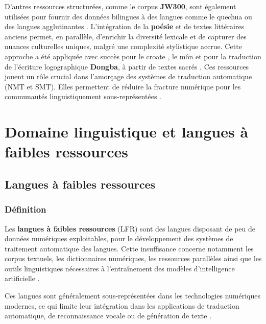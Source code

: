 D'autres ressources structurées, comme le corpus \textbf{JW300}, sont également utilisées pour fournir des données bilingues à des langues comme le quechua ou des langues agglutinantes \cite{chen-fazio-2021-morphologically, kann2022americasnli}. L'intégration de la \textbf{poésie} et de textes littéraires anciens permet, en parallèle, d'enrichir la diversité lexicale et de capturer des nuances culturelles uniques, malgré une complexité stylistique accrue. Cette approche a été appliquée avec succès pour le croate \cite{dundjer2020automatic}, le môn \cite{tun2025exploring} et pour la traduction de l'écriture logographique \textbf{Dongba}, à partir de textes sacrés \cite{ma2025dongba}. Ces ressources jouent un rôle crucial dans l'amorçage des systèmes de traduction automatique (\ac{NMT} et \ac{SMT}). Elles permettent de réduire la fracture numérique pour les communautés linguistiquement sous-représentées \cite{ranathunga2023neural}.

\section{Domaine linguistique et langues à faibles ressources}

\subsection{Langues à faibles ressources}

\subsubsection{Définition}

Les \textbf{langues à faibles ressources} (\ac{LFR}) sont des langues disposant de peu de données numériques exploitables, pour le développement des systèmes de traitement automatique des langues. Cette insuffisance concerne notamment les corpus textuels, les dictionnaires numériques, les ressources parallèles ainsi que les outils linguistiques nécessaires à l'entraînement des modèles d'intelligence artificielle \cite{ranathunga2023neural, agyei2024low}.

Ces langues sont généralement sous-représentées dans les technologies numériques modernes, ce qui limite leur intégration dans les applications de traduction automatique, de reconnaissance vocale ou de génération de texte \cite{ranathunga2023neural, haulai2023construction}.

